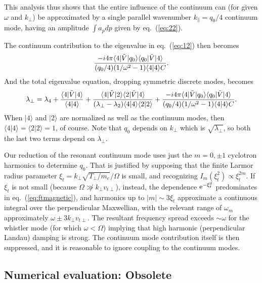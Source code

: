 \documentclass[12pt]{article}
\def\ket#1{|#1\rangle}
\def\bra#1{\langle#1}
\def\etothe#1{{\rm e}^{#1}}
\begin{document}
This analysis thus shows that the entire influence of the continuum
can (for given $\omega$ and $k_\perp$) be approximated by a single
parallel wavenumber $k_\parallel= q_{0}/4$ continuum mode, having an
amplitude $\int a_p dp$ given by eq.\ (\ref{eq:22}).

The continuum contribution to the eigenvalue in eq.\ (\ref{eq:12}) then
becomes
\begin{equation}
  \label{eigcon}
  {-i4\pi\bra{4}|\tilde V \ket{q_{0}}\bra{q_{0}}|\tilde{V}\ket{4}
    \over
    (q_{0}/4)(1/\omega^2-1)\bra{4}\ket{4}C}\iffalse
  =
  {-i4\pi\bra{4}|\tilde V \ket{q_{0}}\bra{q_{0}}|\tilde{V}\ket{4}
    \over
    k_\parallel(1/\omega^2-1)\bra{4}\ket{4}C}\fi.
\end{equation}
And the total eigenvalue equation, dropping symmetric discrete modes, becomes
\begin{equation}
  \label{eigtotal}
  \lambda_\perp=\lambda_4+{\bra{4}|\tilde{V}\ket{4}\over
    \bra{4}\ket{4}}
    +{\bra{4}|\tilde{V}\ket{2}\bra{2}|\tilde{V}\ket{4}\over
      (\lambda_\perp-\lambda_2)\bra{4}\ket{4} \bra{2}\ket{2}}
    +%
    {-i4\pi\bra{4}|\tilde V \ket{q_{0}}\bra{q_{0}}|\tilde{V}\ket{4}
    \over
    (q_{0}/4)(1/\omega^2-1)\bra{4}\ket{4}C}.
\end{equation}
When $\ket{4}$ and $\ket{2}$ are normalized as well as the
continuum modes, then $\bra{4}\ket{4}=\bra{2}\ket{2}=1$, of
course. Note that $q_0$ depends on $k_\perp$ which is
$\sqrt{\lambda_\perp}$, so both the last two terms depend on
$\lambda_\perp$.

Our reduction of the resonant continuum mode uses just the $m=0,\pm 1$
cyclotron harmonics to determine $q_{0}.$ That is justified by
supposing that the finite Larmor radius parameter
$\xi_t=k_\perp\sqrt{T_\perp/m_e}/\Omega$ is small, and recognizing
$I_m(\xi_t^2)\propto \xi_t^{2m}$. If $\xi_t$ is not small (because
$\Omega\not\gg k_\perp v_{t\perp}$), instead, the dependence
$\etothe{-\xi_t^2}$ predominates in eq.\ (\ref{eq:ftmagnetic}), and
harmonics up to $|m|\sim 3\xi_t$ approximate a continuous integral
over the perpendicular Maxwellian, with the relevant range of
$\omega_m$ approximately $\omega\pm 3k_\perp v_{t\perp}$. The
resultant frequency spread exceeds $\sim\omega$ for the whistler mode
(for which $\omega < \Omega$) implying that high harmonic
(perpendicular Landau) damping is strong. The continuum mode
contribution itself is then suppressed, and it is reasonable to ignore
coupling to the continuum modes.

\subsection{Numerical evaluation:  Obsolete}
\end{document}
